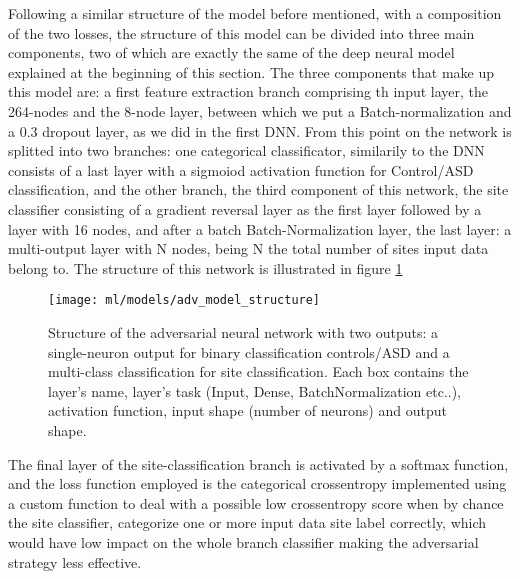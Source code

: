 \documentclass[12pt]{report}
\begin{document}
Following a similar structure of the model before mentioned, with a composition of the two losses, the structure of this model can be divided into three main components, two of which are exactly the same of the deep neural model explained at the beginning of this section.
The three components that make up this model are: a first feature extraction branch comprising th input layer, the 264-nodes and the 8-node layer, between which we put a Batch-normalization and a 0.3 dropout layer, as we did in the first DNN.
From this point on the network is splitted into two branches: one categorical classificator, similarily to the DNN consists of a last layer with a sigmoiod activation function for Control/ASD classification,
and the other branch, the third component of this network, the site classifier consisting of a gradient reversal layer as the first layer followed by a layer with 16 nodes, and after a batch Batch-Normalization layer, the last layer: a multi-output layer with N nodes, being N the total number of sites input data belong to.
The structure of this network is illustrated in figure \ref{fig:adv_model_structure}


\begin{figure}[h!]
\centering
\texttt{[image: ml/models/adv\_model\_structure]}
\caption{Structure of the adversarial neural network with two outputs: a single-neuron output for binary classification controls/ASD and a multi-class classification for site classification.
Each box contains the layer's name, layer's task (Input, Dense, BatchNormalization etc..), activation function, input shape (number of neurons) and output shape.
}
\label{fig:adv_model_structure}
\end{figure}


The final layer of the site-classification branch is activated by a softmax function, and the loss function employed is the categorical crossentropy implemented using a custom function to deal with a possible low crossentropy score when by chance the site classifier, categorize one or more input data site label correctly, which would have low impact on the whole branch classifier making the adversarial strategy less effective.
\end{document}
